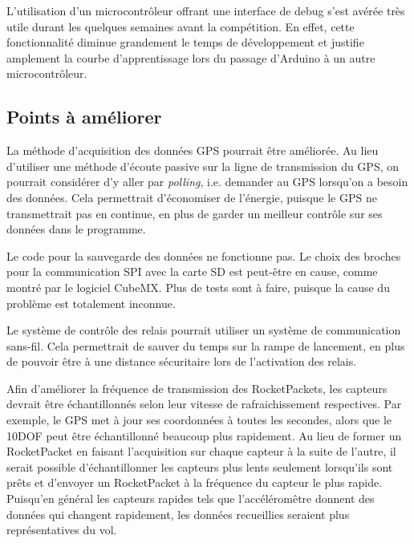 L'utilisation d'un microcontrôleur offrant une interface de debug s'est avérée
très utile durant les quelques semaines avant la compétition. En effet, cette
fonctionnalité diminue grandement le temps de développement et justifie
amplement la courbe d'apprentissage lors du passage d'Arduino à un autre
microcontrôleur.

\subsection{Points à améliorer}

La méthode d'acquisition des données GPS pourrait être améliorée. Au lieu
d'utiliser une méthode d'écoute passive sur la ligne de transmission du GPS, on
pourrait considérer d'y aller par \textit{polling}, i.e. demander au GPS
lorsqu'on a besoin des données. Cela permettrait d'économiser de l'énergie,
puisque le GPS ne transmettrait pas en continue, en plus de garder un meilleur
contrôle sur ses données dans le programme.
\\
\par
Le code pour la sauvegarde des données ne fonctionne pas. Le choix des broches
pour la communication SPI avec la carte SD est peut-être en cause, comme montré
par le logiciel CubeMX. Plus de tests sont à faire, puisque la cause du
problème est totalement inconnue.
\\
\par
Le système de contrôle des relais pourrait utiliser un système de communication
sans-fil. Cela permettrait de sauver du temps sur la rampe de lancement, en
plus de pouvoir être à une distance sécuritaire lors de l'activation des relais.
\\
\par
Afin d'améliorer la fréquence de transmission des RocketPackets, les capteurs
devrait être échantillonnés selon leur vitesse de rafraichissement respectives.
Par exemple, le GPS met à jour ses coordonnées à toutes les secondes, alors que
le 10DOF peut être échantillonné beaucoup plus rapidement. Au lieu de former un
RocketPacket en faisant l'acquisition sur chaque capteur à la suite de l'autre,
il serait possible d'échantillonner les capteurs plus lents seulement
lorsqu'ils sont prêts et d'envoyer un RocketPacket à la fréquence du capteur le
plus rapide. Puisqu'en général les capteurs rapides tels que l'accéléromêtre
donnent des données qui changent rapidement, les données recueillies seraient
plus représentatives du vol.
